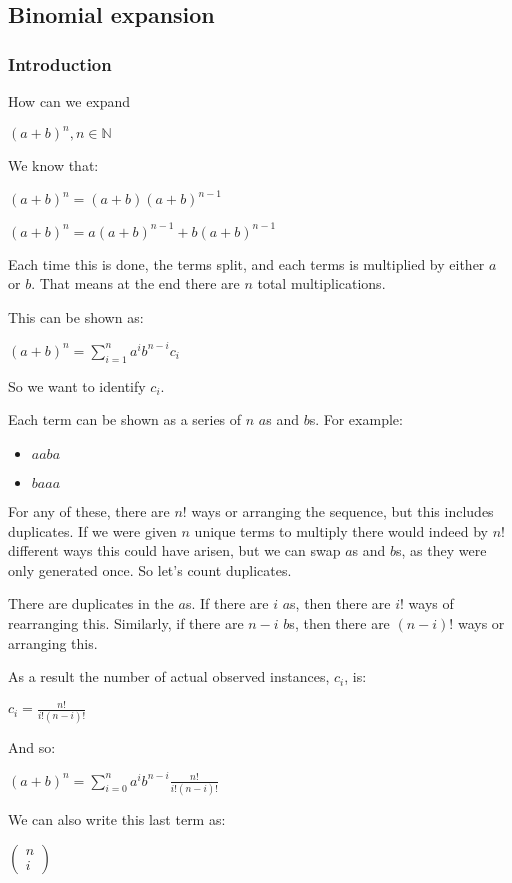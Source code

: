 
\subsection{Binomial expansion}

\subsubsection{Introduction}

How can we expand

$(a+b)^n, n\in \mathbb{N}$

We know that:

$(a+b)^n=(a+b)(a+b)^{n-1}$

$(a+b)^n=a(a+b)^{n-1}+b(a+b)^{n-1}$

Each time this is done, the terms split, and each terms is multiplied by either \(a\) or \(b\). That means at the end there are \(n\) total multiplications.

This can be shown as:

$(a+b)^n=\sum_{i=1}^n a^i b^{n-i} c_i$

So we want to identify \(c_i\).

Each term can be shown as a series of \(n\) \(a\)s and \(b\)s. For example:

\begin{itemize}
\item \(aaba\)
\item \(baaa\)
\end{itemize}

For any of these, there are \(n!\) ways or arranging the sequence, but this includes duplicates. If we were given \(n\) unique terms to multiply there would indeed by \(n!\) different ways this could have arisen, but we can swap \(a\)s and \(b\)s, as they were only generated once. So let's count duplicates.

There are duplicates in the \(a\)s. If there are  \(i\) \(a\)s, then there are \(i!\) ways of rearranging this. Similarly, if there are \(n-i\) \(b\)s, then there are \((n-i)!\) ways or arranging this.

As a result the number of actual observed instances, \(c_i\), is:

$c_i=\frac{n!}{i!(n-i)!}$

And so:

$(a+b)^n=\sum^n_{i=0} a^i b^{n-i} \frac{n!}{i!(n-i)!}$

We can also write this last term as:

$\begin{pmatrix}n\\i\end{pmatrix}$

